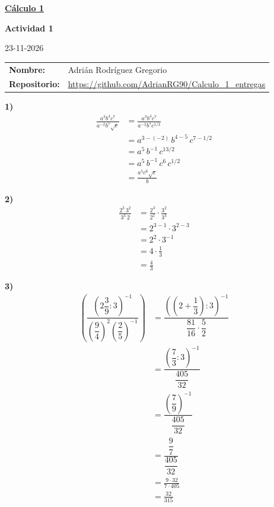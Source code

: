 \documentclass[11pt,a4paper,fleqn]{article}
\begin{document}

\begin{titlepage}
  \centering
  \vspace*{1cm}
  {\Huge\bfseries \underline{Cálculo 1}\par}
  \vfill
  {\huge\bfseries Actividad 1\par}
  \vspace{0.5cm}
  {\Large 23-11-2026\par}
  \vfill
  \begin{tabular}{@{}ll}
    \textbf{Nombre:}      & Adrián Rodríguez Gregorio \\[4pt]
    \textbf{Repositorio:} & \url{https://github.com/AdrianRG90/Calculo_1_entregas} \\
  \end{tabular}
  \vspace*{2cm}
\end{titlepage}


\textbf{1)}
\begin{align*}
  \frac{a^{3}b^{4}c^{7}}{a^{-2}b^{5}\sqrt{c}}
    &= \frac{a^{3}b^{4}c^{7}}{a^{-2}b^{5}c^{1/2}} \\
    &= a^{3-(-2)}\, b^{4-5}\, c^{7-1/2} \\
    &= a^{5}\, b^{-1}\, c^{13/2} \\
    &= a^{5}\, b^{-1}\, c^{6}\, c^{1/2} \\
    &= \frac{a^{5}c^{6}\sqrt{c}}{b}
\end{align*}

\textbf{2)}
\begin{align*}
  \frac{2^{3}\,3^{2}}{3^{3}\,2}
    &= \frac{2^{3}}{2^{1}} \cdot \frac{3^{2}}{3^{3}} \\
    &= 2^{3-1} \cdot 3^{2-3} \\
    &= 2^{2} \cdot 3^{-1} \\
    &= 4 \cdot \frac{1}{3} \\
    &= \frac{4}{3}
\end{align*}

\textbf{3)}
\begin{align*}
  \left( \dfrac{\left( 2\dfrac{3}{9} : 3 \right)^{-1}}
               {\left( \dfrac{9}{4} \right)^{2} \left( \dfrac{2}{5} \right)^{-1}} \right)
    &= \dfrac{\left( \left( 2 + \dfrac{1}{3} \right) : 3 \right)^{-1}}
             {\dfrac{81}{16} \cdot \dfrac{5}{2}} \\[6pt]
    &= \dfrac{\left( \dfrac{7}{3} : 3 \right)^{-1}}{\dfrac{405}{32}} \\[6pt]
    &= \dfrac{\left( \dfrac{7}{9} \right)^{-1}}{\dfrac{405}{32}} \\[6pt]
    &= \dfrac{\dfrac{9}{7}}{\dfrac{405}{32}} \\[6pt]
    &= \frac{9 \cdot 32}{7 \cdot 405} \\[6pt]
    &= \frac{32}{315}
\end{align*}
\end{document}
